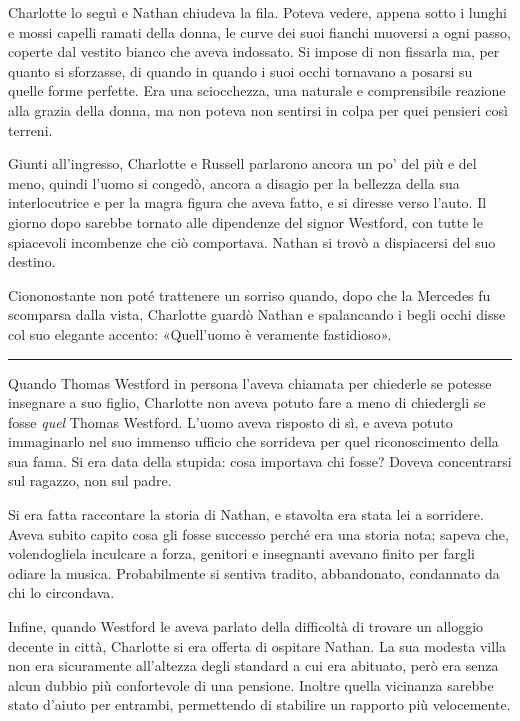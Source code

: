 \documentclass[a4paper,oneside,9pt]{memoir}
\begin{document}
Charlotte lo seguì e Nathan chiudeva la fila. Poteva vedere, appena sotto i lunghi e mossi capelli ramati della donna,
le curve dei suoi fianchi muoversi a ogni passo, coperte dal vestito bianco che aveva indossato. Si impose di non
fissarla ma, per quanto si sforzasse, di quando in quando i suoi occhi tornavano a posarsi su quelle forme perfette. Era
una sciocchezza, una naturale e comprensibile reazione alla grazia della donna, ma non poteva non sentirsi in colpa per
quei pensieri così terreni.

Giunti all'ingresso, Charlotte e Russell parlarono ancora un po' del più e del meno, quindi l'uomo si congedò, ancora
a disagio per la bellezza della sua interlocutrice e per la magra figura che aveva fatto, e si diresse verso l'auto. Il
giorno dopo sarebbe tornato alle dipendenze del signor Westford, con tutte le spiacevoli incombenze che ciò comportava.
Nathan si trovò a dispiacersi del suo destino.

Ciononostante non poté trattenere un sorriso quando, dopo che la Mercedes fu scomparsa dalla vista, Charlotte guardò
Nathan e spalancando i begli occhi disse col suo elegante accento: «Quell'uomo è veramente fastidioso».

\plainbreak{1}

Quando Thomas Westford in persona l'aveva chiamata per chiederle se potesse insegnare a suo figlio, Charlotte non aveva
potuto fare a meno di chiedergli se fosse \emph{quel} Thomas Westford. L'uomo aveva risposto di sì, e aveva potuto
immaginarlo nel suo immenso ufficio che sorrideva per quel riconoscimento della sua fama. Si era data della stupida:
cosa importava chi fosse? Doveva concentrarsi sul ragazzo, non sul padre.

Si era fatta raccontare la storia di Nathan, e stavolta era stata lei a sorridere. Aveva subito capito cosa gli fosse
successo perché era una storia nota; sapeva che, volendogliela inculcare a forza, genitori e insegnanti avevano finito
per fargli odiare la musica. Probabilmente si sentiva tradito, abbandonato, condannato da chi lo circondava.

Infine, quando Westford le aveva parlato della difficoltà di trovare un alloggio decente in città, Charlotte si era
offerta di ospitare Nathan. La sua modesta villa non era sicuramente all'altezza degli standard a cui era abituato,
però era senza alcun dubbio più confortevole di una pensione. Inoltre quella vicinanza sarebbe stato d'aiuto per
entrambi, permettendo di stabilire un rapporto più velocemente.
\end{document}
